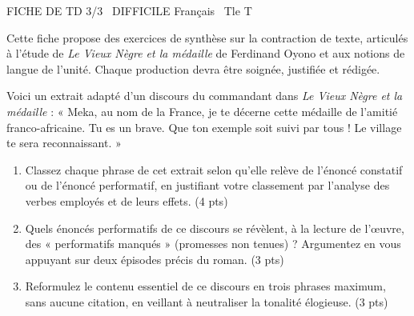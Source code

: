 \documentclass[11pt]{article}
\begin{document}
\begin{tcolorbox}[enhanced,colback=popink,colframe=popink,arc=10pt,boxrule=0pt,left=12pt,right=12pt,top=9pt,bottom=9pt]
{\color{white}\popxbold\small FICHE DE TD 3/3 \textbullet\ DIFFICILE \hfill Français \textbullet\ Tle T\par}
\end{tcolorbox}
\vspace{4pt}
Cette fiche propose des exercices de synthèse sur la contraction de texte, articulés à l'étude de \emph{Le Vieux Nègre et la médaille} de Ferdinand Oyono et aux notions de langue de l'unité. Chaque production devra être soignée, justifiée et rédigée.

\begin{exercice}
Voici un extrait adapté d'un discours du commandant dans \emph{Le Vieux Nègre et la médaille} : « Meka, au nom de la France, je te décerne cette médaille de l'amitié franco-africaine. Tu es un brave. Que ton exemple soit suivi par tous ! Le village te sera reconnaissant. »
\begin{enumerate}
\item Classez chaque phrase de cet extrait selon qu'elle relève de l'énoncé constatif ou de l'énoncé performatif, en justifiant votre classement par l'analyse des verbes employés et de leurs effets. (4 pts)
\item Quels énoncés performatifs de ce discours se révèlent, à la lecture de l'œuvre, des « performatifs manqués » (promesses non tenues) ? Argumentez en vous appuyant sur deux épisodes précis du roman. (3 pts)
\item Reformulez le contenu essentiel de ce discours en trois phrases maximum, sans aucune citation, en veillant à neutraliser la tonalité élogieuse. (3 pts)
\end{enumerate}
\end{exercice}
\end{document}
